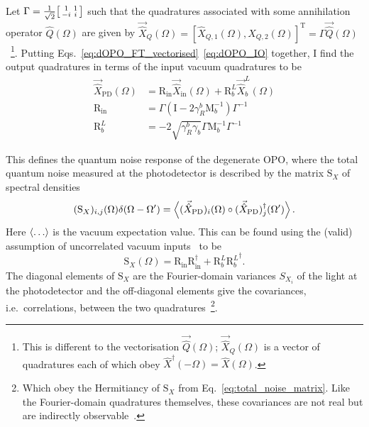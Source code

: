  Let $\Gamma = \frac{1}{\sqrt2} \begin{bsmallmatrix}1 & 1 \\-i & i\end{bsmallmatrix}$ such that the quadratures associated with some annihilation operator $\hat{Q}(\Omega)$ are given by $\vec{\hat{X}}_Q(\Omega)=[\hat{X}_{Q,1}(\Omega),\hat{X}_{Q,2}(\Omega)]^\text{T}=\Gamma \vec{\hat{Q}}(\Omega)$~\footnote{This is different to the vectorisation $\vec{\hat{Q}}(\Omega)$; $\vec{\hat{X}}_Q(\Omega)$ is a vector of quadratures each of which obey $\hat{X}^\dag(-\Omega)=\hat{X}(\Omega)$.}.
Putting Eqs.~\ref{eq:dOPO_FT_vectorised}~\ref{eq:dOPO_IO} together, I find the output quadratures in terms of the input vacuum quadratures to be
\begin{align}
\label{eq:dOPO_PD_as_fn_of_vac}
\vec{\hat X}_\mathrm{PD}(\Omega)&=\text{R}_\text{in}\vec{\hat X}_\mathrm{in}(\Omega)+\text{R}^L_b\vec{\hat X}^L_b(\Omega)\\
\text{R}_\text{in}&=\Gamma\left(\text{I}-2\gamma^b_R\text{M}_b^{-1}\right)\Gamma^{-1}\\
\text{R}^L_b&=-2\sqrt{\gamma^b_R \gamma_b}\Gamma\text{M}_b^{-1}\Gamma^{-1}%
\end{align}

This defines the quantum noise response of the degenerate OPO, where the total quantum noise measured at the photodetector is described by the matrix $\text{S}_X$ of spectral densities 
\begin{equation}\label{eq:total_noise_matrix}
(\text{S}_X)_{i,j}(\Omega)\delta(\Omega-\Omega')=\ev{(\vec{\hat X}_\text{PD})_i(\Omega)\circ(\vec{\hat X}_\text{PD})_j^\dag(\Omega')}.
\end{equation}
Here $\ev{\ldots}$ is the vacuum expectation value. This can be found using the (valid) assumption of uncorrelated vacuum inputs~\cite{} to be
\begin{equation}\label{eq:dOPO_Sx_abstract}
\text{S}_X(\Omega)=\text{R}_\text{in} \text{R}_\text{in}^\dag+\text{R}^L_b {\text{R}^L_b}^\dag. %
\end{equation}
The diagonal elements of $\text{S}_X$ are the Fourier-domain variances $S_{X_i}$ of the light at the photodetector and the off-diagonal elements give the covariances, i.e.\ correlations, between the two quadratures~\footnote{Which obey the Hermitiancy of $\text{S}_X$ from Eq.~\ref{eq:total_noise_matrix}. Like the Fourier-domain quadratures themselves, these covariances are not real but are indirectly observable~\cite{}.}.

